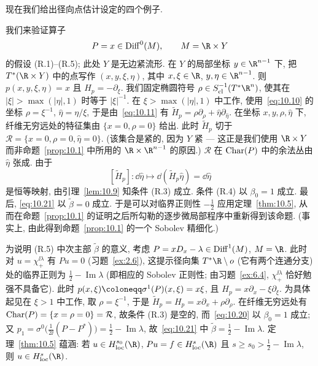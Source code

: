 现在我们给出径向点估计设定的四个例子.

\begin{example}[乘以 $x$]\label{eg:10.11}
我们来验证算子
\begin{equation}\label{eq:10.32}
    P = x \in \Diff^0(M), \qquad M = \R \times Y
\end{equation}
的假设 (R.1)--(R.5); 此处 $Y$ 是无边紧流形. 在 $Y$ 的局部坐标 $y \in \R^{n-1}$ 下, 把 $T^*(\R \times Y)$ 中的点写作 $(x, y, \xi, \eta)$, 其中 $x, \xi \in \R$, $y, \eta \in \R^{n-1}$. 则 $p(x, y, \xi, \eta) = x$ 且 $H_p = -\partial_\xi$. 我们固定椭圆符号 $\rho \in S_{\mathrm{cl}}^{-1}(T^* \R^n)$, 使其在 $|\xi| > \max(|\eta|, 1)$ 时等于 $|\xi|^{-1}$. 在 $\xi > \max(|\eta|, 1)$ 中工作, 使用~\eqref{eq:10.10} 的坐标 $\rho = \xi^{-1}$, $\hat{\eta} = \eta/\xi$, 于是由~\eqref{eq:10.11} 有 $\tilde{H}_p = \rho\partial_\rho + \hat{\eta}\partial_{\hat{\eta}}$. 在坐标 $x, y, \rho, \hat{\eta}$ 下, 纤维无穷远处的特征集由 $\{x = 0, \rho = 0\}$ 给出. 此时 $\tilde{H}_p$ 切于 $\mathcal{R} = \{x = 0, \rho = 0, \hat{\eta} = 0\}$. (该集合是紧的, 因为 $Y$ 紧 --- 这正是我们使用 $\R \times Y$ 而非命题~\ref{prop:10.1} 中所用的 $\R \times \R^{n-1}$ 的原因.) $\mathcal{R}$ 在 $\operatorname{Char}(P)$ 中的余法丛由 $\hat{\eta}$ 张成. 由于
\begin{equation}\label{eq:10.33}
    [\tilde{H}_p] \colon \dd\hat{\eta} \mapsto \dd(\tilde{H}_p \hat{\eta}) = \dd\hat{\eta}
\end{equation}
是恒等映射, 由引理~\ref{lem:10.9} 知条件 (R.3) 成立. 条件 (R.4) 以 $\beta_0 = 1$ 成立. 最后, \eqref{eq:10.21} 以 $\tilde{\beta} = 0$ 成立. 于是可以对临界正则性 $-\frac{1}{2}$ 应用定理~\ref{thm:10.5}, 从而在命题~\ref{prop:10.1} 的证明之后所勾勒的逐步微局部程序中重新得到该命题. (事实上, 由此得到命题~\ref{prop:10.1} 的一个 Sobolev 精细化.)
\end{example}

\begin{example}[非对称算子]\label{eg:10.12}
为说明 (R.5) 中次主部 $\tilde{\beta}$ 的意义, 考虑 $P = x D_x - \lambda \in \operatorname{Diff}^1(M)$, $M = \R$. 此时对 $u = \chi_+^{\ii\lambda}$ 有 $P u = 0$ (习题~\ref{ex:2.6}), 这提示径向集 $T^* \R \setminus o$ (它有两个连通分支) 处的临界正则为 $\frac{1}{2} - \operatorname{Im}\lambda$ (即相应的 Sobolev 正则性; 由习题~\ref{ex:6.4}, $\chi_+^{\ii\lambda}$ 恰好勉强不具备它). 此时 $p(x, \xi) \defeq \sigma^1(P)(x, \xi) = x\xi$, 且 $H_p = x\partial_x - \xi\partial_\xi$. 为具体起见在 $\xi > 1$ 中工作, 取 $\rho = \xi^{-1}$, 于是 $\tilde{H}_p = H_p = x\partial_x + \rho\partial_\rho$. 在纤维无穷远处有 $\operatorname{Char}(P) = \{x = \rho = 0\} = \mathcal{R}$, 故条件 (R.3) 是空的, 而~\eqref{eq:10.20} 以 $\beta_0 = 1$ 成立; 又 $p_1 = \sigma^0\bigl(\frac{1}{2\ii}(P - P^*)\bigr) = \frac{1}{2} - \operatorname{Im}\lambda$, 故~\eqref{eq:10.21} 中 $\tilde{\beta} = \frac{1}{2} - \operatorname{Im}\lambda$. 定理~\ref{thm:10.5} 蕴涵: 若 $u \in H_{\mathrm{loc}}^{s_0}(\R)$, $P u = f \in H_{\mathrm{loc}}^{s}(\R)$ 且 $s \ge s_0 > \frac{1}{2} - \operatorname{Im}\lambda$, 则 $u \in H_{\mathrm{loc}}^{s}(\R)$.
\end{example}

